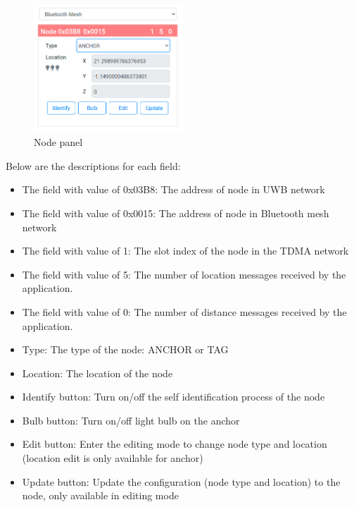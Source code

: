 \documentclass[\main/main.tex]{subfiles}
\begin{document}
\begin{figure}[H]   
    \centering
    \includegraphics[width=0.5\textwidth]{control_and_manage_pannel.png}
    \caption{Node panel}
    \label{fig:control_and_manage_pannel}
\end{figure}

Below are the descriptions for each field:
\begin{itemize}
    \item The field with value of 0x03B8: The address of node in UWB network
    \item The field with value of 0x0015: The address of node in Bluetooth mesh network
    \item The field with value of 1: The slot index of the node in the TDMA network
    \item The field with value of 5: The number of location messages received by the application.
    \item The field with value of 0: The number of distance messages received by the application.
    \item Type: The type of the node: ANCHOR or TAG
    \item Location: The location of the node
    \item Identify button: Turn on/off the self identification process of the node
    \item Bulb button: Turn on/off light bulb on the anchor
    \item Edit button: Enter the editing mode to change node type and location (location edit is only available for anchor)
    \item Update button: Update the configuration (node type and location) to the node, only available in editing mode
\end{itemize}

\bib
\end{document}
